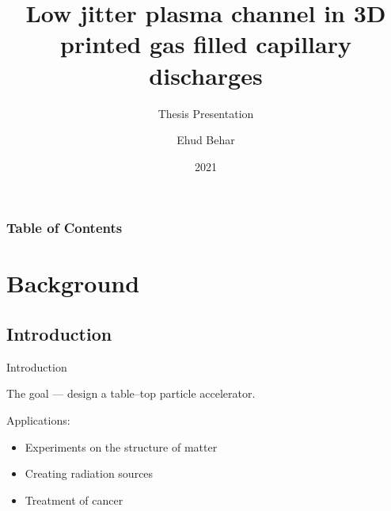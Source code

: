 \documentclass[dvipsnames]{beamer}
\title{Low jitter plasma channel in 3D printed gas filled capillary discharges}
\subtitle{Thesis Presentation}
\author{Ehud Behar}
\institute{Hebrew University of Jerusalem}
\date{2021}
\begin{document}
\frame{\titlepage}
\begin{frame}
\frametitle{Table of Contents}
\tableofcontents
\end{frame}

\section{Background}
\subsection{Introduction}
  \begin{frame}{Introduction}
  \begin{center}
    The goal --- design a table--top particle accelerator.
  \end{center}
    Applications:
    \begin{itemize}
        \item[\textbullet] Experiments on the structure of matter
        \item[\textbullet] Creating radiation sources
        \item[\textbullet] Treatment of cancer
    \end{itemize}
  \end{frame}
\end{document}

